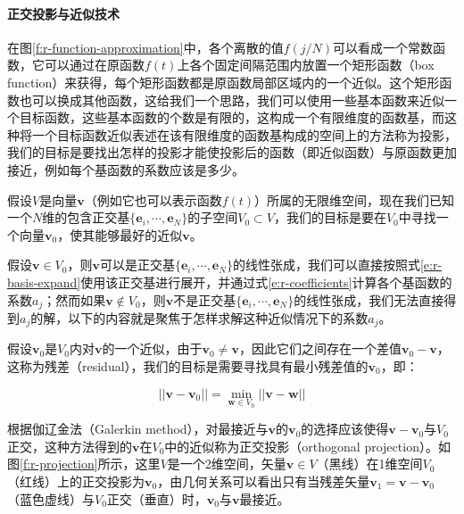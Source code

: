 \paragraph{正交投影与近似技术}
在图\ref{f:r-function-approximation}中，各个离散的值$f(j/N)$可以看成一个常数函数，它可以通过在原函数$f(t)$上各个固定间隔范围内放置一个矩形函数（box function）来获得，每个矩形函数都是原函数局部区域内的一个近似。这个矩形函数也可以换成其他函数，这给我们一个思路，我们可以使用一些基本函数来近似一个目标函数，这些基本函数的个数是有限的，这构成一个有限维度的函数基，而这种将一个目标函数近似表述在该有限维度的函数基构成的空间上的方法称为投影，我们的目标是要找出怎样的投影才能使投影后的函数（即近似函数）与原函数更加接近，例如每个基函数的系数应该是多少。

假设$V$是向量$\mathbf{v}$（例如它也可以表示函数$f(t)$）所属的无限维空间，现在我们已知一个$N$维的包含正交基$\{\mathbf{e}_i,\cdots,\mathbf{e}_N\}$的子空间$V_0\subset V$，我们的目标是要在$V_0$中寻找一个向量$\mathbf{v}_0$，使其能够最好的近似$\mathbf{v}$。

假设$\mathbf{v}\in V_0$，则$\mathbf{v}$可以是正交基$\{\mathbf{e}_i,\cdots,\mathbf{e}_N\}$的线性张成，我们可以直接按照式\ref{e:r-basis-expand}使用该正交基进行展开，并通过式\ref{e:r-coefficients}计算各个基函数的系数$a_j$；然而如果$\mathbf{v}\notin V_0$，则$\mathbf{v}$不是正交基$\{\mathbf{e}_i,\cdots,\mathbf{e}_N\}$的线性张成，我们无法直接得到$a_j$的解，以下的内容就是聚焦于怎样求解这种近似情况下的系数$a_j$。

假设$\mathbf{v}_0$是$V_0$内对$\mathbf{v}$的一个近似，由于$\mathbf{v}_0\neq\mathbf{v}$，因此它们之间存在一个差值$\mathbf{v}_0-\mathbf{v}$，这称为残差（residual），我们的目标是需要寻找具有最小残差值的$\mathbf{v}_0$，即：

\begin{equation}
	||\mathbf{v}-\mathbf{v}_0||=\min_{\mathbf{w}\in V_0}||\mathbf{v}-\mathbf{w}||
\end{equation}

根据伽辽金法（Galerkin method）\cite{a:FiniteElementMethodsforGlobalIllumination,a:GalerkinaRadiosity:AHigherOrderSolutionMethodforGlobalIllumination}，对最接近与$\mathbf{v}$的$\mathbf{v}_0$的选择应该使得$\mathbf{v}-\mathbf{v}_0$与$V_0$正交，这种方法得到的$\mathbf{v}$在$V_0$中的近似称为正交投影（orthogonal projection）。如图\ref{f:r-projection}所示，这里$V$是一个2维空间，矢量$\mathbf{v}\in V$（黑线）在1维空间$V_0$（红线）上的正交投影为$\mathbf{v}_0$，由几何关系可以看出只有当残差矢量$\mathbf{v}_1=\mathbf{v}-\mathbf{v}_0$（蓝色虚线）与$V_0$正交（垂直）时，$\mathbf{v}_0$与$\mathbf{v}$最接近。

